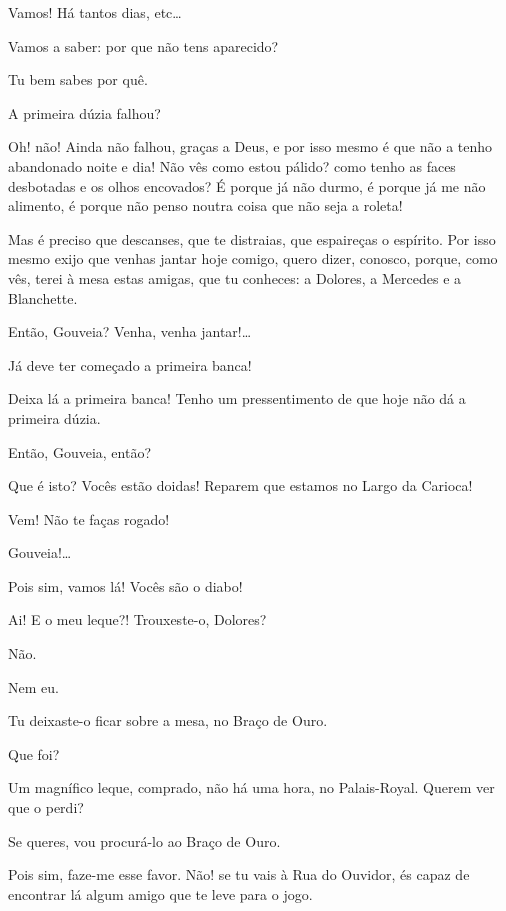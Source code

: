  Vamos!
 Há tantos dias, etc\ldots{}

 Vamos a saber: por que não tens aparecido?

 Tu bem sabes por quê.

 A primeira dúzia falhou?

 Oh! não! Ainda não falhou, graças a Deus, e por isso mesmo é que
não a tenho abandonado noite e dia! Não vês como estou pálido? como tenho as
faces desbotadas e os olhos encovados? É porque já não durmo, é porque já me não
alimento, é porque não penso noutra coisa que não seja a roleta!

 Mas é preciso que descanses, que te distraias, que espaireças o
espírito. Por isso mesmo exijo que venhas jantar hoje comigo, quero dizer, conosco,
porque, como vês, terei à mesa estas amigas, que tu conheces: a Dolores, a Mercedes
e a Blanchette.

 Então, Gouveia? Venha, venha jantar!\ldots{}

 Já deve ter começado a primeira banca!

 Deixa lá a primeira banca! Tenho um pressentimento de que hoje não
dá a primeira dúzia.

 Então, Gouveia, então? 

  Que é isto? Vocês estão doidas! Reparem que
estamos no Largo da Carioca!

 Vem! Não te faças rogado!

  Gouveia!\ldots{}

 Pois sim, vamos lá! Vocês são o diabo!

 Ai! E o meu leque?! Trouxeste-o, Dolores?

 Não.

 Nem eu.

 Tu deixaste-o ficar sobre a mesa, no Braço de Ouro.

 Que foi?

 Um magnífico leque, comprado, não há uma hora, no Palais-Royal.
Querem ver que o perdi?

 Se queres, vou procurá-lo ao Braço de Ouro.

 Pois sim, faze-me esse favor.  Não! se tu vais à
Rua do Ouvidor, és capaz de encontrar lá algum amigo que te leve para o jogo.

